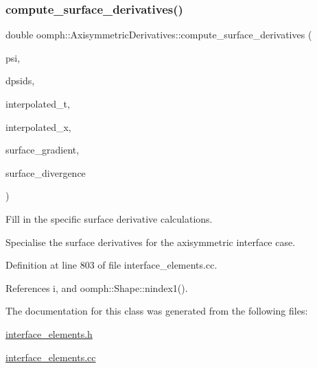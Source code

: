 \subsubsection{\texorpdfstring{compute\+\_\+surface\+\_\+derivatives()}{compute\_surface\_derivatives()}}
{\footnotesize\ttfamily double oomph\+::\+Axisymmetric\+Derivatives\+::compute\+\_\+surface\+\_\+derivatives (\begin{DoxyParamCaption}\item[{const \hyperlink{classoomph_1_1Shape}{Shape} \&}]{psi,  }\item[{const \hyperlink{classoomph_1_1DShape}{D\+Shape} \&}]{dpsids,  }\item[{const \hyperlink{classoomph_1_1DenseMatrix}{Dense\+Matrix}$<$ double $>$ \&}]{interpolated\+\_\+t,  }\item[{const \hyperlink{classoomph_1_1Vector}{Vector}$<$ double $>$ \&}]{interpolated\+\_\+x,  }\item[{\hyperlink{classoomph_1_1DShape}{D\+Shape} \&}]{surface\+\_\+gradient,  }\item[{\hyperlink{classoomph_1_1DShape}{D\+Shape} \&}]{surface\+\_\+divergence }\end{DoxyParamCaption})\hspace{0.3cm}{\ttfamily [protected]}}



Fill in the specific surface derivative calculations. 

Specialise the surface derivatives for the axisymmetric interface case. 

Definition at line 803 of file interface\+\_\+elements.\+cc.



References i, and oomph\+::\+Shape\+::nindex1().



The documentation for this class was generated from the following files\+:\begin{DoxyCompactItemize}
\item 
\hyperlink{interface__elements_8h}{interface\+\_\+elements.\+h}\item 
\hyperlink{interface__elements_8cc}{interface\+\_\+elements.\+cc}\end{DoxyCompactItemize}
